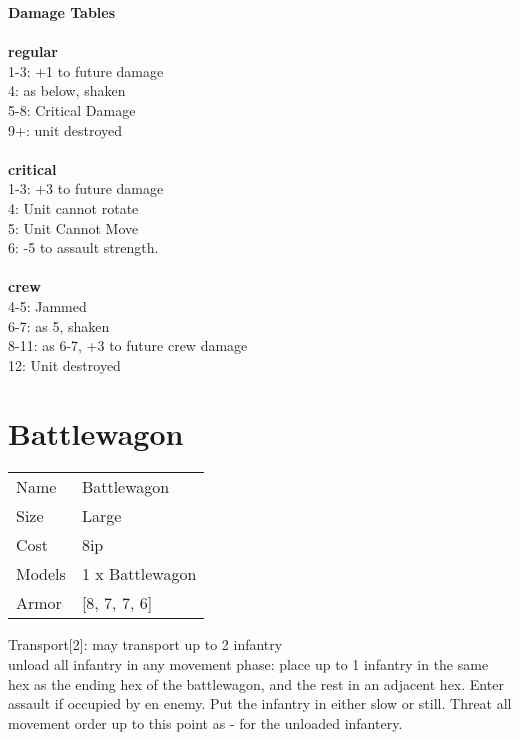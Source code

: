 {\bf Damage Tables} \\
\ \\ {\bf regular } \\
1-3: +1 to future damage \\
4: as below, shaken \\
5-8: Critical Damage \\
9+: unit destroyed \\
\ \\ {\bf critical } \\
1-3: +3 to future damage \\
4: Unit cannot rotate \\
5: Unit Cannot Move \\
6: -5 to assault strength. \\
\ \\ {\bf crew } \\
4-5: Jammed \\
6-7: as 5, shaken \\
8-11: as 6-7, +3 to future crew damage \\
12: Unit destroyed \\










\pagebreak\pagebreak

\section{ Battlewagon }

\begin{tabular}{ll}
  Name & Battlewagon \\
  Size & Large\\
  Cost & 8ip\\
  Models & 1 x Battlewagon\\
  Armor & [8, 7, 7, 6]\\
\end{tabular}

\noindent Transport[2]: may transport up to 2 infantry\\ 
unload all infantry in any movement phase: place up to 1 infantry in the same hex as the ending hex of the battlewagon, and the rest in an adjacent hex. Enter assault if occupied by en enemy. Put the infantry in either slow or still. Threat all movement order up to this point as - for the unloaded infantery.\\ 


